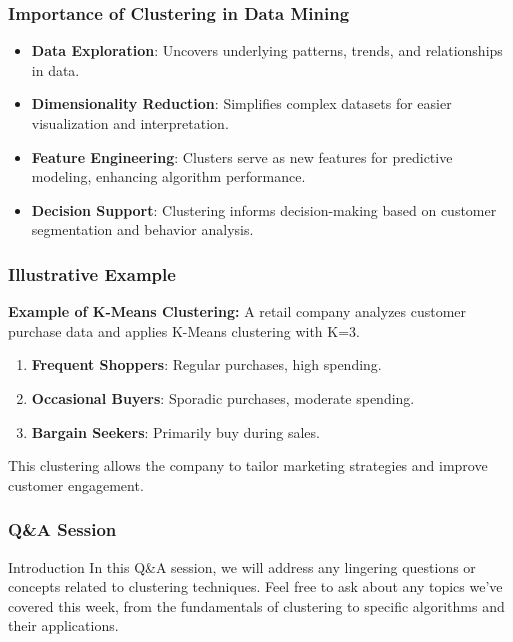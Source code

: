 \documentclass[aspectratio=169]{beamer}
\begin{document}
\begin{frame}[fragile]
    \frametitle{Importance of Clustering in Data Mining}

    \begin{itemize}
        \item \textbf{Data Exploration}: Uncovers underlying patterns, trends, and relationships in data.
        \item \textbf{Dimensionality Reduction}: Simplifies complex datasets for easier visualization and interpretation.
        \item \textbf{Feature Engineering}: Clusters serve as new features for predictive modeling, enhancing algorithm performance.
        \item \textbf{Decision Support}: Clustering informs decision-making based on customer segmentation and behavior analysis.
    \end{itemize}
\end{frame}

\begin{frame}[fragile]
    \frametitle{Illustrative Example}

    \textbf{Example of K-Means Clustering:}
    A retail company analyzes customer purchase data and applies K-Means clustering with K=3. 

    \begin{enumerate}
        \item \textbf{Frequent Shoppers}: Regular purchases, high spending.
        \item \textbf{Occasional Buyers}: Sporadic purchases, moderate spending.
        \item \textbf{Bargain Seekers}: Primarily buy during sales.
    \end{enumerate}

    This clustering allows the company to tailor marketing strategies and improve customer engagement.
\end{frame}

\begin{frame}[fragile]
    \frametitle{Q\&A Session}
    \begin{block}{Introduction}
        In this Q\&A session, we will address any lingering questions or concepts related to clustering techniques. Feel free to ask about any topics we've covered this week, from the fundamentals of clustering to specific algorithms and their applications.
    \end{block}
\end{frame}
\end{document}
